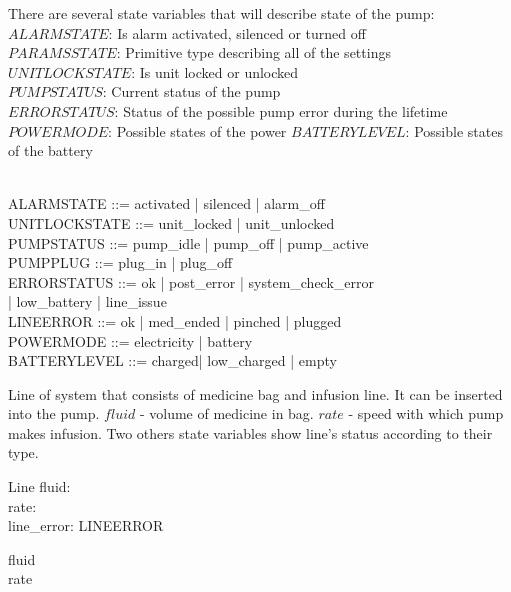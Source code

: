\documentclass{article}
\begin{document}
	
	There are several state variables that will describe state of the pump:\\
	
	
	$ALARMSTATE$: Is alarm activated, silenced or turned off\\
	$PARAMSSTATE$: Primitive type describing all of the settings\\
	$UNITLOCKSTATE$: Is unit locked or unlocked \\
	$PUMPSTATUS$: Current status of the pump\\
	$ERRORSTATUS$: Status of the possible pump error during the lifetime\\
	$POWERMODE$: Possible states of the power
	$BATTERYLEVEL$: Possible states of the battery 
	
	\begin{zed}	
		[PARAMSSTATE] \\ %
		
		ALARMSTATE ::= activated | silenced | alarm\_off \\
		
	
		UNITLOCKSTATE ::= unit\_locked | unit\_unlocked \\
	
		PUMPSTATUS ::= pump\_idle | pump\_off | pump\_active \\
		
		PUMPPLUG ::=  plug\_in | plug\_off\\
		
		ERRORSTATUS ::= ok |  post\_error | system\_check\_error \\ |  low\_battery | line\_issue \\
		
		LINEERROR ::= ok | med\_ended | pinched | plugged \\
		
		POWERMODE ::= electricity | battery  \\
		
		BATTERYLEVEL ::= charged| low\_charged | empty\\
	
	\end{zed}
	
	
	Line of system that consists of medicine bag and infusion line. It can be inserted into the pump. $fluid$ - volume of medicine in bag. $rate$ - speed with which pump makes infusion. Two others state variables show line's status according to their type.
	
	\begin{schema}{Line}
		fluid: \nat \\
		rate: \nat \\
		line\_error: LINEERROR
	\where

	
		fluid  \\ 
		rate 
	\end{schema}
	
\end{document}
